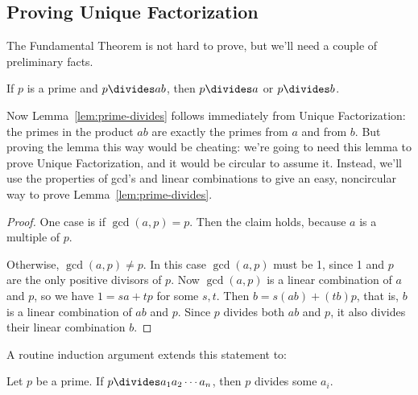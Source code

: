 \subsection{Proving Unique Factorization}

The Fundamental Theorem is not hard to prove, but we'll need a couple
of preliminary facts.

\begin{lemma}
\label{lem:prime-divides}
If $p$ is a prime and $p \divides ab$, then $p \divides a$ or $p
\divides b$.
\end{lemma}

Now Lemma~\ref{lem:prime-divides} follows immediately from Unique
Factorization: the primes in the product $ab$ are exactly the primes
from $a$ and from $b$.  But proving the lemma this way would be
cheating: we're going to need this lemma to prove Unique
Factorization, and it would be circular to assume it.  Instead, we'll
use the properties of gcd's and linear combinations to give an easy,
noncircular way to prove Lemma~\ref{lem:prime-divides}.

\begin{proof}
One case is if $\gcd(a, p) = p$.  Then the claim holds, because $a$ is
a multiple of $p$.

Otherwise, $\gcd(a, p) \neq p$.  In this case $\gcd(a, p)$ must be 1,
since 1 and $p$ are the only positive divisors of $p$.  Now $\gcd(a,
p)$ is a linear combination of $a$ and $p$, so we have $1=sa+tp$ for
some $s,t$.  Then $b =s(ab)+ (tb)p$, that is, $b$ is a linear
combination of $ab$ and $p$.  Since $p$ divides both $ab$ and $p$, it
also divides their linear combination $b$.
\end{proof}

A routine induction argument extends this statement to:\iffalse the
fact we assumed last time:\fi

\begin{lemma}
\label{lem:prime-divides-ind}
Let $p$ be a prime.  If $p \divides a_1 a_2 \cdots a_n$, then $p$
divides some $a_i$.
\end{lemma}


